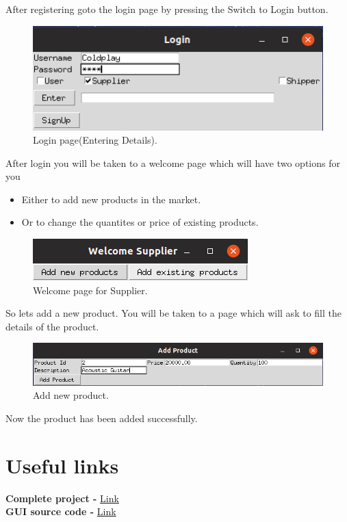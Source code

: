 \documentclass[a4paper,12pt]{article}
\begin{document}
After registering goto the login page by pressing the Switch to Login button.
\begin{figure}[H]
    \centering
    \includegraphics[scale=0.5]{login2.png} 
    \caption{Login page(Entering Details).}
\end{figure}
After login you will be taken to a welcome page which will have two options for you 
\begin{itemize}
    \item Either to add new products in the market.
    \item Or to change the quantites or price of existing products. 
\end{itemize}
\begin{figure}[H]
    \centering
    \includegraphics[scale=0.5]{supp1.png} 
    \caption{Welcome page for Supplier.}
\end{figure}
So lets add a new product. You will be taken to a page which will ask to fill the details of the product.
\begin{figure}[H]
    \centering
    \includegraphics[scale=0.5]{supp2.png} 
    \caption{Add new product.}
\end{figure}
Now the product has been added successfully.

\newpage
\section{Useful links}
\begin{center}
\textbf{Complete project - } \href{https://github.com/nikhilyadv/DBMS-Lab-Project}{Link}\\
\textbf{GUI source code - } \href{https://github.com/nikhilyadv/DBMS-Lab-Project/tree/master/GUI}{Link}
\end{center}
\newpage
\end{document}
